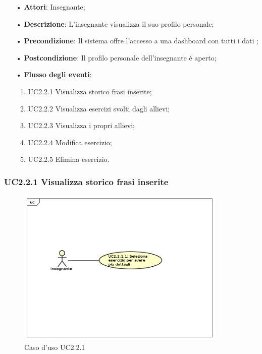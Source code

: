 \begin{itemize}
	\item[•] \textbf{Attori}: Insegnante;
	\item[•] \textbf{Descrizione}: L’insegnante visualizza il suo profilo personale;

	\item[•] \textbf{Precondizione}: Il sistema offre l’accesso a una dashboard con tutti i dati ;

	\item[•] \textbf{Postcondizione}:  Il profilo personale dell’insegnante è aperto;
	\item[•] \textbf{Flusso degli eventi}:
		\begin{enumerate}
			\item UC2.2.1 Visualizza storico frasi inserite;
			\item UC2.2.2 Visualizza esercizi svolti dagli allievi;
			\item UC2.2.3 Visualizza i propri allievi;
			\item UC2.2.4 Modifica esercizio;
			\item UC2.2.5 Elimina esercizio.
		\end{enumerate}
\end{itemize}

\subsubsection{UC2.2.1  Visualizza storico frasi inserite}

\begin{figure}[H]
\centering
\includegraphics[width=10cm]{img/UC221.png} 
\caption{Caso d'uso UC2.2.1}
\end{figure}

